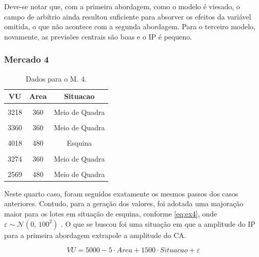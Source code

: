 \documentclass[
  a4paper, 11pt]{article}
\begin{document}
Deve-se notar que, com a primeira abordagem, como o modelo é viesado, o
campo de arbítrio ainda resultou suficiente para absorver os efeitos da
variável omitida, o que não acontece com a segunda abordagem. Para o
terceiro modelo, novamente, as previsões centrais são boas e o IP é
pequeno.

\newpage

\hypertarget{mercado-4}{%
\subsubsection{Mercado 4}\label{mercado-4}}

\begin{table}[ht]
\centering
\begin{tabular}{ccc}
  \hline
VU & Area & Situacao \\ 
  \hline
\cellcolor{gray!6}{3137} & \cellcolor{gray!6}{360} & \cellcolor{gray!6}{Meio de Quadra }\\ 
  3218 & 360 & Meio de Quadra \\ 
\cellcolor{gray!6}{  3116} & \cellcolor{gray!6}{360} & \cellcolor{gray!6}{Meio de Quadra }\\ 
  3360 & 360 & Meio de Quadra \\ 
\cellcolor{gray!6}{  4133} & \cellcolor{gray!6}{480} & \cellcolor{gray!6}{Esquina }\\ 
  4018 & 480 & Esquina \\ 
\cellcolor{gray!6}{  3249} & \cellcolor{gray!6}{360} & \cellcolor{gray!6}{Meio de Quadra }\\ 
  3274 & 360 & Meio de Quadra \\ 
\cellcolor{gray!6}{  2658} & \cellcolor{gray!6}{480} & \cellcolor{gray!6}{Meio de Quadra }\\ 
  2569 & 480 & Meio de Quadra \\ 
   \hline
\end{tabular}
\caption{Dados para o M. 4.} 
\label{tab:ex4}
\end{table}

Neste quarto caso, foram seguidos exatamente os mesmos passos dos casos
anteriores. Contudo, para a geração dos valores, foi adotada uma
majoração maior para os lotes em situação de esquina, conforme
\ref{eq:ex4}, onde \(\varepsilon \sim \mathcal{N}(0, \,100^2)\) . O que
se buscou foi uma situação em que a amplitude do IP para a primeira
abordagem extrapole a amplitude do CA.

\begin{equation} \label{eq:ex4}
VU = 5000 - 5 \cdot Area + 1500 \cdot Situacao + \varepsilon
\end{equation}
\end{document}

